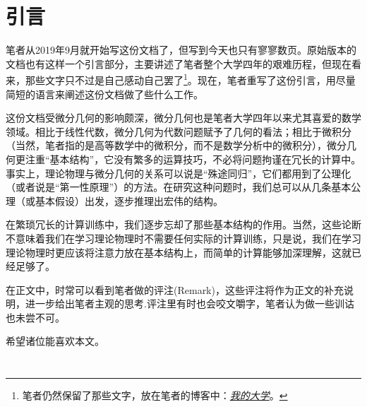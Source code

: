 \part{引言}
    笔者从2019年9月就开始写这份文档了，但写到今天也只有寥寥数页。原始版本的文档也有这样一个引言部分，主要讲述了笔者整个大学四年的艰难历程，但现在看来，那些文字只不过是自己感动自己罢了\footnote{笔者仍然保留了那些文字，放在笔者的博客中：\href{https://shunzdai.now.sh/2020/06/04/My-Life-In-College/}{\textit{我的大学}}。}。现在，笔者重写了这份引言，用尽量简短的语言来阐述这份文档做了些什么工作。
	
    这份文档受微分几何的影响颇深，微分几何也是笔者大学四年以来尤其喜爱的数学领域。相比于线性代数，微分几何为代数问题赋予了几何的看法；相比于微积分（当然，笔者指的是高等数学中的微积分，而不是数学分析中的微积分），微分几何更注重“基本结构”，它没有繁多的运算技巧，不必将问题拘谨在冗长的计算中。事实上，理论物理与微分几何的关系可以说是“殊途同归”，它们都用到了公理化（或者说是“第一性原理”）的方法。在研究这种问题时，我们总可以从几条基本公理（或基本假设）出发，逐步推理出宏伟的结构。
    
    在繁琐冗长的计算训练中，我们逐步忘却了那些基本结构的作用。当然，这些论断不意味着我们在学习理论物理时不需要任何实际的计算训练，只是说，我们在学习理论物理时更应该将注意力放在基本结构上，而简单的计算能够加深理解，这就已经足够了。

    在正文中，时常可以看到笔者做的评注(Remark)，这些评注将作为正文的补充说明，进一步给出笔者主观的思考.评注里有时也会咬文嚼字，笔者认为做一些训诂也未尝不可。

    希望诸位能喜欢本文。
    
    $\quad$

    $\quad$

    